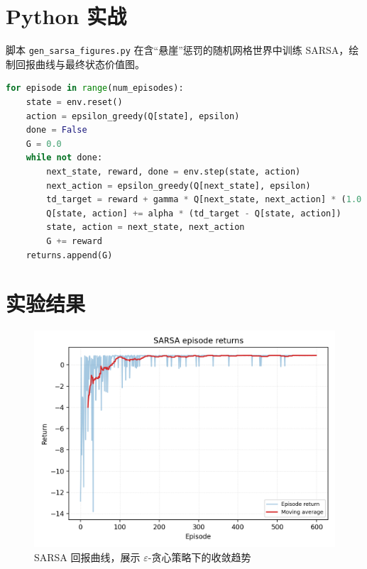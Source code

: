 \documentclass[UTF8,zihao=-4]{ctexart}
\begin{document}
\section{Python 实战}
脚本 \texttt{gen\_sarsa\_figures.py} 在含“悬崖”惩罚的随机网格世界中训练 SARSA，绘制回报曲线与最终状态价值图。
\begin{lstlisting}[language=Python,caption={脚本 gen_sarsa_figures.py 片段}]
for episode in range(num_episodes):
    state = env.reset()
    action = epsilon_greedy(Q[state], epsilon)
    done = False
    G = 0.0
    while not done:
        next_state, reward, done = env.step(state, action)
        next_action = epsilon_greedy(Q[next_state], epsilon)
        td_target = reward + gamma * Q[next_state, next_action] * (1.0 - float(done))
        Q[state, action] += alpha * (td_target - Q[state, action])
        state, action = next_state, next_action
        G += reward
    returns.append(G)
\end{lstlisting}

\section{实验结果}
\begin{figure}[H]
  \centering
  \includegraphics[width=0.8\linewidth]{sarsa_returns.png}
  \caption{SARSA 回报曲线，展示 \(\varepsilon\)-贪心策略下的收敛趋势}
  \label{fig:sarsa_returns_cn}
\end{figure}
\end{document}
